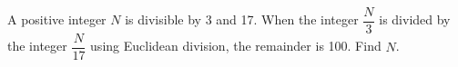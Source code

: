 A positive integer $N$ is divisible by 3 and 17. When the integer $\dfrac{N}{3}$ is divided by the integer $\dfrac{N}{17}$ using Euclidean division, the remainder is 100. Find $N$.
